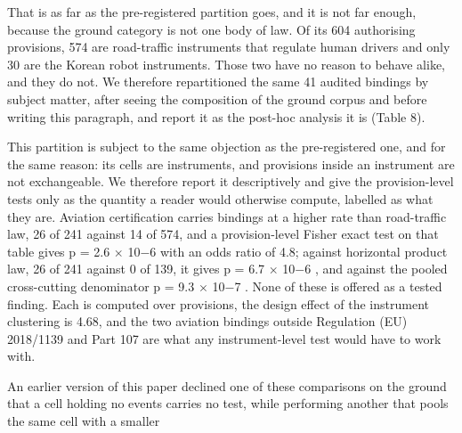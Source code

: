 That is as far as the pre-registered partition goes, and it is not far enough, because the ground category is not one body of law. Of its 604 authorising provisions, 574 are road-traffic instruments that regulate human drivers and only 30 are the Korean robot instruments. Those two have no reason to behave alike, and they do not. We therefore repartitioned the same 41 audited bindings by subject matter, after seeing the composition of the ground corpus and before writing this paragraph, and report it as the post-hoc analysis it is (Table 8).

This partition is subject to the same objection as the pre-registered one, and for the same reason: its cells are instruments, and provisions inside an instrument are not exchangeable. We therefore report it descriptively and give the provision-level tests only as the quantity a reader would otherwise compute, labelled as what they are. Aviation certification carries bindings at a higher rate than road-traffic law, 26 of 241 against 14 of 574, and a provision-level Fisher exact test on that table gives p = 2.6 $\times$ 10$-$6 with an odds ratio of 4.8; against horizontal product law, 26 of 241 against 0 of 139, it gives p = 6.7 $\times$ 10$-$6 , and against the pooled cross-cutting denominator p = 9.3 $\times$ 10$-$7 . None of these is offered as a tested finding. Each is computed over provisions, the design effect of the instrument clustering is 4.68, and the two aviation bindings outside Regulation (EU) 2018/1139 and Part 107 are what any instrument-level test would have to work with.

An earlier version of this paper declined one of these comparisons on the ground that a cell holding no events carries no test, while performing another that pools the same cell with a smaller

